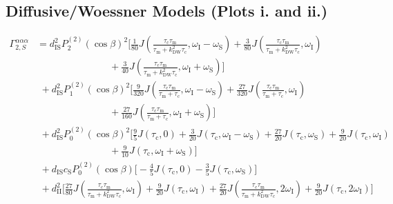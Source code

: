 \begin{appendixtext}
\section{Diffusive/Woessner Models (Plots i. and ii.)}
\footnotesize
\begin{equation*}
\begin{split}
\Gamma_{2,S}^{\alpha\alpha\alpha}&=d_{\text{IS}}^2P_2^{(2)}(\cos\beta)^2\bigg[\frac{1}{80}J\left(\frac{\tau_{\text{c}}\tau_{\text{m}}}{\tau_{\text{m}}+k_{\text{DW}}^2\tau_{\text{c}}},\omega_{\text{I}}-\omega_{\text{S}}\right)+\frac{3}{80}J\left(\frac{\tau_{\text{c}}\tau_{\text{m}}}{\tau_{\text{m}}+k_{\text{DW}}^2\tau_{\text{c}}},\omega_{\text{I}}\right) \\ 
&\hspace{90pt}+\frac{3}{40}J\left(\frac{\tau_{\text{c}}\tau_{\text{m}}}{\tau_{\text{m}}+k_{\text{DW}}^2\tau_{\text{c}}},\omega_{\text{I}}+\omega_{\text{S}}\right)\bigg] \\
&\hspace{4pt}+d_{\text{IS}}^2P_1^{(2)}(\cos\beta)^2\bigg[\frac{9}{320}J\left(\frac{\tau_{\text{c}}\tau_{\text{m}}}{\tau_{\text{m}}+\tau_{\text{c}}},\omega_{\text{I}}-\omega_{\text{S}}\right)+\frac{27}{320}J\left(\frac{\tau_{\text{c}}\tau_{\text{m}}}{\tau_{\text{m}}+\tau_{\text{c}}},\omega_{\text{I}}\right) \\ 
&\hspace{90pt}+\frac{27}{160}J\left(\frac{\tau_{\text{c}}\tau_{\text{m}}}{\tau_{\text{m}}+\tau_{\text{c}}},\omega_{\text{I}}+\omega_{\text{S}}\right)\bigg] \\
&\hspace{4pt}+d_{\text{IS}}^2P_0^{(2)}(\cos\beta)^2\bigg[\frac{9}{5}J(\tau_{\text{c}},0)+\frac{3}{20}J\left(\tau_{\text{c}},\omega_{\text{I}}-\omega_{\text{S}}\right)+\frac{27}{20}J\left(\tau_{\text{c}},\omega_{\text{S}}\right)+\frac{9}{20}J\left(\tau_{\text{c}},\omega_{\text{I}}\right) \\ 
&\hspace{90pt}+\frac{9}{10}J\left(\tau_{\text{c}},\omega_{\text{I}}+\omega_{\text{S}}\right)\bigg] \\
&\hspace{4pt}+d_{\text{IS}}c_{\text{S}}P_0^{(2)}(\cos\beta)\bigg[-\frac{4}{5}J\left(\tau_{\text{c}},0\right)-\frac{3}{5}J\left(\tau_{\text{c}},\omega_{\text{S}}\right)\bigg] \\
&\hspace{4pt}+d_{\text{II}}^2\bigg[\frac{27}{80}J\left(\frac{\tau_{\text{c}}\tau_{\text{m}}}{\tau_{\text{m}}+k_{\text{DW}}^2\tau_{\text{c}}},\omega_{\text{I}}\right)+\frac{9}{20}J\left(\tau_{\text{c}},\omega_{\text{I}}\right)+\frac{27}{20}J\left(\frac{\tau_{\text{c}}\tau_{\text{m}}}{\tau_{\text{m}}+k_{\text{DW}}^2\tau_{\text{c}}},2\omega_{\text{I}}\right)+\frac{9}{20}J\left(\tau_{\text{c}},2\omega_{\text{I}}\right)\bigg] \\

\end{split}
\end{equation*}
\end{appendixtext}
